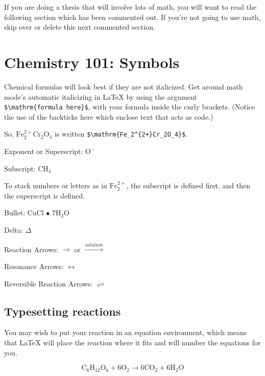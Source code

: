 \documentclass[12pt,twoside]{reedthesis}
\begin{document}
  If you are doing a thesis that will involve lots of math, you will want
  to read the following section which has been commented out. If you're
  not going to use math, skip over or delete this next commented section.
  
  \section{Chemistry 101: Symbols}\label{chemistry-101-symbols}
  
  Chemical formulas will look best if they are not italicized. Get around
  math mode's automatic italicizing in LaTeX by using the argument
  \texttt{\$\textbackslash{}mathrm\{formula\ here\}\$}, with your formula
  inside the curly brackets. (Notice the use of the backticks here which
  enclose text that acts as code.)
  
  So, \(\mathrm{Fe_2^{2+}Cr_2O_4}\) is written
  \texttt{\$\textbackslash{}mathrm\{Fe\_2\^{}\{2+\}Cr\_2O\_4\}\$}.
  
  \noindent Exponent or Superscript: \(\mathrm{O^-}\)
  
  \noindent Subscript: \(\mathrm{CH_4}\)
  
  To stack numbers or letters as in \(\mathrm{Fe_2^{2+}}\), the subscript
  is defined first, and then the superscript is defined.
  
  \noindent Bullet: CuCl \(\bullet\) \(\mathrm{7H_{2}O}\)
  
  \noindent Delta: \(\Delta\)
  
  \noindent Reaction Arrows: \(\longrightarrow\) or
  \(\xrightarrow{solution}\)
  
  \noindent Resonance Arrows: \(\leftrightarrow\)
  
  \noindent Reversible Reaction Arrows: \(\rightleftharpoons\)
  
  \subsection{Typesetting reactions}\label{typesetting-reactions}
  
  You may wish to put your reaction in an equation environment, which
  means that LaTeX will place the reaction where it fits and will number
  the equations for you.
  
  \begin{equation}
    \mathrm{C_6H_{12}O_6  + 6O_2} \longrightarrow \mathrm{6CO_2 + 6H_2O}
    \label{eq:reaction}
  \end{equation}
  
\end{document}
